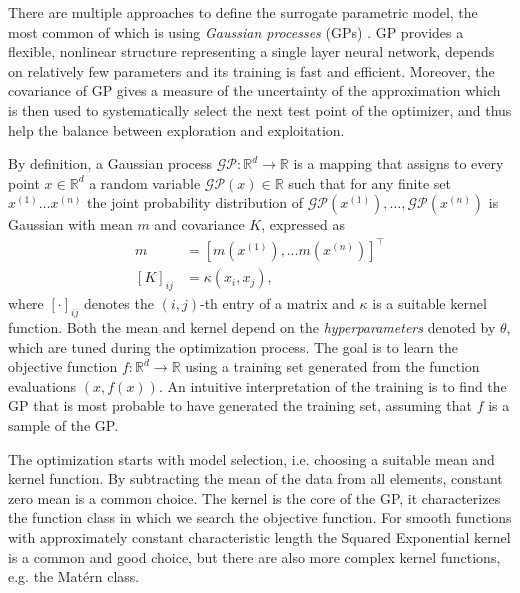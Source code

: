 There are multiple approaches to define the surrogate parametric model, the most common of which is using \textit{Gaussian processes} (GPs) \cite{GPMPC2019}. GP provides a flexible, nonlinear structure representing a single layer neural network, depends on relatively few parameters and its training is fast and efficient. Moreover, the covariance of GP gives a measure of the uncertainty of the approximation which is then used to systematically select the next test point of the optimizer, and thus help the balance between exploration and exploitation.

By definition, a Gaussian process $\mathcal{GP}: \mathbb{R}^{d} \rightarrow \mathbb{R}$ is a mapping that assigns to every point $x \in \mathbb{R}^{d}$ a random variable $\mathcal{G} \mathcal{P}(x) \in \mathbb{R}$ such that for any finite set $x^{(1)} \ldots x^{(n)}$ the joint probability distribution of $\mathcal{G} \mathcal{P}\left(x^{(1)}\right), \ldots, \mathcal{G} \mathcal{P}\left(x^{(n)}\right)$ is Gaussian with mean $m$ and covariance $K$, expressed as
\begin{subequations}
\begin{align}
m &=\left[m\left(x^{(1)}\right), \ldots m\left(x^{(n)}\right)\right]^{\top} \\
[K]_{i j} &=\kappa\left(x_{i}, x_{j}\right),
\end{align}
\end{subequations}
where $[\cdot]_{i j}$ denotes the $(i, j)$-th entry of a matrix and $\kappa$ is a suitable kernel function. Both the mean and kernel depend on the \textit{hyperparameters} denoted by $\theta$, which are tuned during the optimization process. The goal is to learn the objective function $f:\mathbb{R}^d \rightarrow \mathbb{R}$ using a training set generated from the function evaluations $(x, f(x))$. An intuitive interpretation of the training is to find the GP that is most probable to have generated the training set, assuming that $f$ is a sample of the GP. 

The optimization starts with model selection, i.e. choosing a suitable mean and kernel function. By subtracting the mean of the data from all elements, constant zero mean is a common choice. The kernel is the core of the GP, it characterizes the function class in which we search the objective function. For smooth functions with approximately constant characteristic length the Squared Exponential kernel is a common and good choice, but there are also more complex kernel functions, e.g. the Matérn class.

